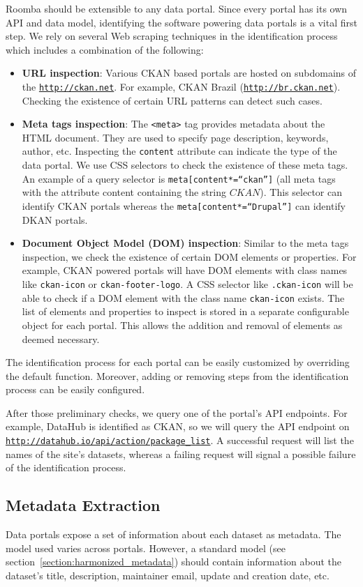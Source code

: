 Roomba should be extensible to any data portal. Since every portal has its own API and data model, identifying the software powering data portals is a vital first step. We rely on several Web scraping techniques in the identification process which includes a combination of the following:
\begin{itemize}
  \item \textbf{URL inspection}: Various CKAN based portals are hosted on subdomains of the \texttt{\url{http://ckan.net}}. For example, CKAN Brazil (\texttt{\url{http://br.ckan.net}}). Checking the existence of certain URL patterns can detect such cases.
  \item \textbf{Meta tags inspection}: The \texttt{<meta>} tag provides metadata about the HTML document. They are used to specify page description, keywords, author, etc. Inspecting the \texttt{content} attribute can indicate the type of the data portal. We use CSS selectors to check the existence of these meta tags. An example of a query selector is \texttt{meta[content*=``ckan'']} (all meta tags with the attribute content containing the string $CKAN$). This selector can identify CKAN portals whereas the \texttt{meta[content*=``Drupal'']} can identify DKAN portals.
  \item \textbf{Document Object Model (DOM) inspection}: Similar to the meta tags inspection, we check the existence of certain DOM elements or properties. For example, CKAN powered portals will have DOM elements with class names like \texttt{ckan-icon} or \texttt{ckan-footer-logo}. A CSS selector like \texttt{.ckan-icon} will be able to check if a DOM element with the class name \texttt{ckan-icon} exists.
  The list of elements and properties to inspect is stored in a separate configurable object for each portal. This allows the addition and removal of elements as deemed necessary.
\end{itemize}
The identification process for each portal can be easily customized by overriding the default function. Moreover, adding or removing steps from the identification process can be easily configured.

After those preliminary checks, we query one of the portal's API endpoints. For example, DataHub is identified as CKAN, so we will query the API endpoint on \texttt{\url{http://datahub.io/api/action/package\_list}}. A successful request will list the names of the site's datasets, whereas a failing request will signal a possible failure of the identification process.

\subsection{Metadata Extraction}
Data portals expose a set of information about each dataset as metadata. The model used varies across portals. However, a standard model (see section~\ref{section:harmonized_metadata}) should contain information about the dataset's title, description, maintainer email, update and creation date, etc.

